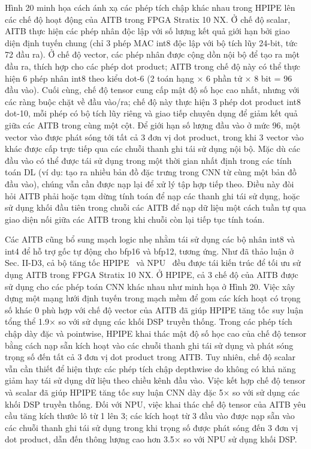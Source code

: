 \documentclass[a4paper]{article}
\begin{document}
Hình 20 minh họa cách ánh xạ các phép tích chập khác nhau trong HPIPE lên các chế độ hoạt động của AITB trong FPGA Stratix 10 NX. Ở chế độ scalar, AITB thực hiện các phép nhân độc lập với số lượng kết quả giới hạn bởi giao diện định tuyến chung (chỉ 3 phép MAC int8 độc lập với bộ tích lũy 24-bit, tức 72 đầu ra). Ở chế độ vector, các phép nhân được cộng dồn nội bộ để tạo ra một đầu ra, thích hợp cho các phép dot product; AITB trong chế độ này có thể thực hiện 6 phép nhân int8 theo kiểu dot-6 (2 toán hạng × 6 phần tử × 8 bit = 96 đầu vào). Cuối cùng, chế độ tensor cung cấp mật độ số học cao nhất, nhưng với các ràng buộc chặt về đầu vào/ra; chế độ này thực hiện 3 phép dot product int8 dot-10, mỗi phép có bộ tích lũy riêng và giao tiếp chuyên dụng để giảm kết quả giữa các AITB trong cùng một cột. Để giới hạn số lượng đầu vào ở mức 96, một vector vào được phát sóng tới tất cả 3 đơn vị dot product, trong khi 3 vector vào khác được cấp trực tiếp qua các chuỗi thanh ghi tái sử dụng nội bộ. Mặc dù các đầu vào có thể được tái sử dụng trong một thời gian nhất định trong các tính toán DL (ví dụ: tạo ra nhiều bản đồ đặc trưng trong CNN từ cùng một bản đồ đầu vào), chúng vẫn cần được nạp lại để xử lý tập hợp tiếp theo. Điều này đòi hỏi AITB phải hoặc tạm dừng tính toán để nạp các thanh ghi tái sử dụng, hoặc sử dụng khối đầu tiên trong chuỗi các AITB để nạp dữ liệu một cách tuần tự qua giao diện nối giữa các AITB trong khi chuỗi còn lại tiếp tục tính toán.

Các AITB cũng bổ sung mạch logic nhẹ nhằm tái sử dụng các bộ nhân int8 và int4 để hỗ trợ gốc tự động cho bfp16 và bfp12, tương ứng. Như đã thảo luận ở Sec. II-D3, cả bộ tăng tốc HPIPE~\cite{72} và NPU~\cite{24} đều được tái kiến trúc để tối ưu sử dụng AITB trong FPGA Stratix 10 NX. Ở HPIPE, cả 3 chế độ của AITB được sử dụng cho các phép toán CNN khác nhau như minh họa ở Hình 20. Việc xây dựng một mạng lưới định tuyến trong mạch mềm để gom các kích hoạt có trọng số khác 0 phù hợp với chế độ vector của AITB đã giúp HPIPE tăng tốc suy luận tổng thể 1.9× so với sử dụng các khối DSP truyền thống. Trong các phép tích chập dày đặc và pointwise, HPIPE khai thác mật độ số học cao của chế độ tensor bằng cách nạp sẵn kích hoạt vào các chuỗi thanh ghi tái sử dụng và phát sóng trọng số đến tất cả 3 đơn vị dot product trong AITB. Tuy nhiên, chế độ scalar vẫn cần thiết để hiện thực các phép tích chập depthwise do không có khả năng giảm hay tái sử dụng dữ liệu theo chiều kênh đầu vào. Việc kết hợp chế độ tensor và scalar đã giúp HPIPE tăng tốc suy luận CNN dày đặc 5× so với sử dụng các khối DSP truyền thống. Đối với NPU, việc khai thác chế độ tensor của AITB yêu cầu tăng kích thước lô từ 1 lên 3; các kích hoạt từ 3 đầu vào được nạp sẵn vào các chuỗi thanh ghi tái sử dụng trong khi trọng số được phát sóng đến 3 đơn vị dot product, dẫn đến thông lượng cao hơn 3.5× so với NPU sử dụng khối DSP.
\end{document}
